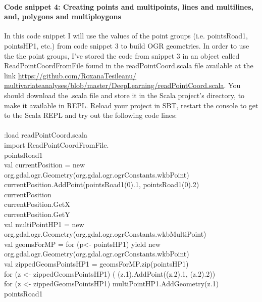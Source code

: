 \documentclass {article}
\begin{document}
\paragraph{Code snippet 4: Creating points and multipoints, lines and multilines, and, polygons and multiploygons}

In this code snippet I will use the values of the point groups (i.e. pointsRoad1, pointsHP1, etc.) from code snippet 3 to build OGR geometries.
 In order to use the the point groups, I've stored the code from snippet 3 in an object called ReadPointCoordFromFile found in the readPointCoord.scala file available at the link \href{https://github.com/RoxanaTesileanu/multivariate_analyses/blob/master/DeepLearning/readPointCoord.scala}{https://github.com/RoxanaTesileanu/\\multivariate\underline{\space}analyses/blob/master/DeepLearning/readPointCoord.scala}. You should download the .scala file and store it in the Scala project's directory, to make it available in REPL. Reload your project in SBT, restart the console to get to the Scala REPL and try out the following code lines:
\\
\\
:load readPointCoord.scala\\
import ReadPointCoordFromFile.\underline{\space}\\
pointsRoad1\\
val currentPosition = new org.gdal.ogr.Geometry(org.gdal.ogr.ogrConstants.wkbPoint)\\
currentPosition.AddPoint(pointsRoad1(0).\underline{\space}1, pointsRoad1(0).\underline{\space}2)\\
currentPosition\\
currentPosition.GetX\\
currentPosition.GetY\\
val multiPointHP1 = new org.gdal.ogr.Geometry(org.gdal.ogr.ogrConstants.wkbMultiPoint)\\
val geomsForMP = for (p<- pointsHP1) yield new org.gdal.ogr.Geometry(org.gdal.ogr.ogrConstants.wkbPoint)\\
val zippedGeomsPointsHP1 = geomsForMP.zip(pointsHP1)\\
for (z <- zippedGeomsPointsHP1)  ( (z.\underline{\space}1).AddPoint((z.\underline{\space}2).\underline{\space}1, (z.\underline{\space}2).\underline{\space}2))\\
for (z <- zippedGeomsPointsHP1) multiPointHP1.AddGeometry(z.\underline{\space}1)\\
pointsRoad1\\
\end{document}
